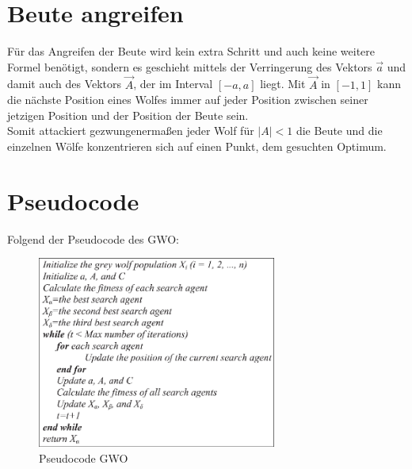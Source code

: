 \section{Beute angreifen}
Für das Angreifen der Beute wird kein extra Schritt und auch keine weitere Formel benötigt, sondern es geschieht mittels der Verringerung des Vektors $\vec{a}$ und damit auch des Vektors $\vec{A}$, der im Interval $[-a, a]$ liegt. Mit $\vec{A}$ in $[-1, 1]$ kann die nächste Position eines Wolfes immer auf jeder Position zwischen seiner jetzigen Position und der Position der Beute sein. \\
Somit attackiert gezwungenermaßen jeder Wolf für $|A| < 1$ die Beute und die einzelnen Wölfe konzentrieren sich auf einen Punkt, dem gesuchten Optimum. 
\section{Pseudocode}
Folgend der Pseudocode des GWO:
\begin{figure}[ht]
    \begin{center}
        \includegraphics[width=0.7\textwidth]{assets/img/Pseudo-code-of-Grey-Wolf-Optimization-GWO-algorithm.png}
        \caption[Pseudocode GWO]{Pseudocode GWO \cite{MIRJALILI201446}}
        \label{gwo_pseudocode}
    \end{center}
\end{figure}